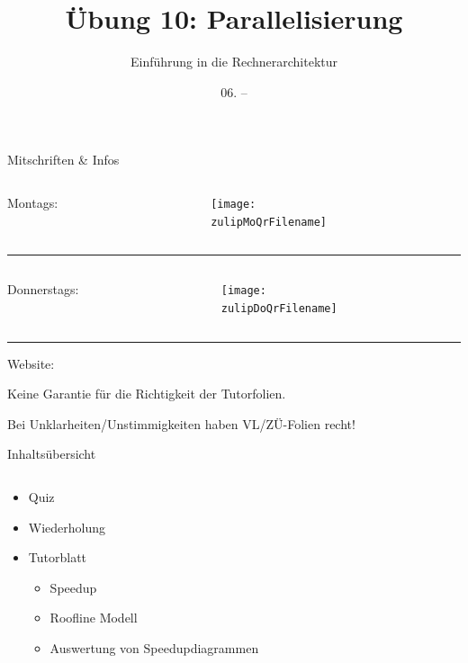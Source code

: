 \documentclass[
  german,            %
  aspectratio=169,    %
]{tumbeamer}
\title{Übung 10: Parallelisierung}
\subtitle{Einführung in die Rechnerarchitektur}
\author{\theAuthorName}
\institute{\theGroupName\\\theSchoolName\\\theUniversityName}
\date{06. -- \DTMdisplaydate{2025}{01}{12}{-1}}
\begin{document}
\maketitle

\begin{frame}[c]{Mitschriften \& Infos}{}
  \begin{minipage}[t]{\textwidth}
    \begin{columns}[c]
      \begin{column}{0.8\textwidth}
        Montags: \href{\zulipMo}{\zulipMo}
      \end{column}
      \begin{column}{0.2\textwidth}
        \texttt{[image: \\zulipMoQrFilename]}
      \end{column}
    \end{columns}
  \end{minipage}
  \rule{\textwidth}{0.4pt}
  \begin{minipage}[t]{\textwidth}
    \begin{columns}[c]
      \begin{column}{0.8\textwidth}
        Donnerstags: \href{\zulipDo}{\zulipDo}
      \end{column}
      \begin{column}{0.2\textwidth}
        \texttt{[image: \\zulipDoQrFilename]}
      \end{column}
    \end{columns}
  \end{minipage}
  \ifdefined\myWebsite
  \rule{\textwidth}{0.4pt}
  \centering
  Website: \href{\myWebsite}{\myWebsite}
  \fi
\end{frame}

\begin{frame}[c]{}{}
  \begin{center}
    \LARGE  Keine Garantie für die Richtigkeit der Tutorfolien.

    \Large Bei Unklarheiten/Unstimmigkeiten haben VL/ZÜ-Folien recht!
  \end{center}
\end{frame}

\begin{frame}[c]{Inhaltsübersicht}{}
  \begin{columns}[c]
    \begin{column}{1\textwidth}
      \begin{itemize}
        \item Quiz
        \item Wiederholung
        \item Tutorblatt
        \begin{itemize}
          \item Speedup
          \item Roofline Modell
          \item Auswertung von Speedupdiagrammen
        \end{itemize}
      \end{itemize}
    \end{column}
  \end{columns}
\end{frame}
\end{document}
